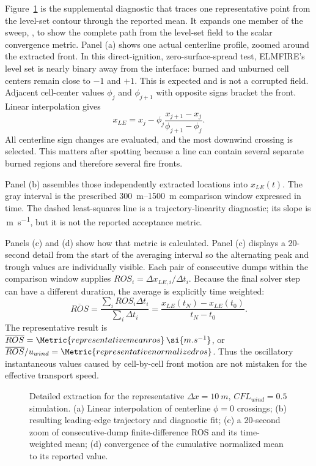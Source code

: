 Figure~\ref{fig:front-extraction} is the supplemental diagnostic that traces
one representative point from the level-set contour through the reported mean.
It expands one member of the sweep,
\texttt{}, to show the complete path from the
level-set field to the scalar convergence metric.  Panel (a) shows one actual
centerline profile, zoomed around the extracted front.  In this direct-ignition,
zero-surface-spread test, ELMFIRE's level set is nearly binary away from the
interface: burned and unburned cell centers remain close to $-1$ and $+1$.
This is expected and is not a corrupted field.  Adjacent cell-center values
$\phi_j$ and $\phi_{j+1}$ with opposite signs bracket the front.  Linear
interpolation gives
\begin{equation}
 x_{LE}=x_j-\phi_j\frac{x_{j+1}-x_j}{\phi_{j+1}-\phi_j}.
\end{equation}
All centerline sign changes are evaluated, and the most downwind crossing is
selected.  This matters after spotting because a line can contain several
separate burned regions and therefore several fire fronts.

Panel (b) assembles those independently extracted locations into
$x_{LE}(t)$.  The gray interval is the prescribed \SIrange{300}{1500}{m}
comparison window expressed in time.  The dashed least-squares line is a
trajectory-linearity diagnostic; its slope is
\,\si{m.s^{-1}}, but it is not the reported
acceptance metric.

Panels (c) and (d) show how that metric is calculated.  Panel (c) displays
a 20-second detail from the start of the averaging interval so the alternating
peak and trough values are individually visible.  Each pair of consecutive
dumps within the comparison window supplies
$ROS_i=\Delta x_{LE,i}/\Delta t_i$.  Because the final solver step can have a
different duration, the average is explicitly time weighted:
\begin{equation}
 \overline{ROS}
 =\frac{\sum_i ROS_i\Delta t_i}{\sum_i\Delta t_i}
 =\frac{x_{LE}(t_N)-x_{LE}(t_0)}{t_N-t_0}.
\end{equation}
The representative result is
$\overline{ROS}=\Metric{representativemeanros}\,\si{m.s^{-1}}$, or
$\overline{ROS}/u_{wind}=\Metric{representativenormalizedros}$.  Thus the
oscillatory instantaneous values caused by cell-by-cell front motion are not
mistaken for the effective transport speed.

\begin{figure}[H]
  \centering
  \caption{Detailed extraction for the representative $\Delta x=\SI{10}{m}$,
  $CFL_{wind}=0.5$ simulation.  (a) Linear interpolation of centerline
  $\phi=0$ crossings; (b) resulting leading-edge trajectory and diagnostic
  fit; (c) a 20-second zoom of consecutive-dump finite-difference ROS and
  its time-weighted mean; (d) convergence of the cumulative normalized mean
  to its reported value.}
  \label{fig:front-extraction}
\end{figure}

